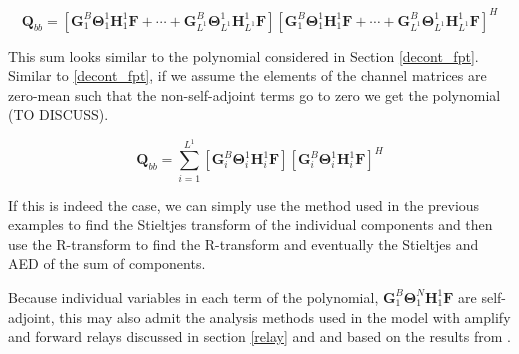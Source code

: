 \documentclass[12pt,a4paper]{report}
\begin{document}
\begin{equation}
\mathbf{Q}_{bb} = [\mathbf{G}^{B}_{1}\boldsymbol{\Theta}^{1}_{1}\mathbf{H}^{1}_{1}\mathbf{F} + 
\cdots + \mathbf{G}^{B}_{L^{1}}\boldsymbol{\Theta}^{1}_{L^{1}}\mathbf{H}^{1}_{L^{1}}\mathbf{F}]
[\mathbf{G}^{B}_{1}\boldsymbol{\Theta}^{1}_{1}\mathbf{H}^{1}_{1}\mathbf{F} + 
\cdots + \mathbf{G}^{B}_{L^{1}}\boldsymbol{\Theta}^{1}_{L^{1}}\mathbf{H}^{1}_{L^{1}}\mathbf{F}]^H
\end{equation}

This sum looks similar to the polynomial considered in Section \ref{decont_fpt}. Similar to \ref{decont_fpt}, if we assume the elements of the channel matrices are zero-mean such that the non-self-adjoint terms go to zero we get the polynomial   (TO DISCUSS). 

\begin{equation}
\mathbf{Q}_{bb} = \sum_{i=1}^{L^{1}}[\mathbf{G}^{B}_{i}\boldsymbol{\Theta}^{1}_{i}\mathbf{H}^{1}_{i}\mathbf{F}]
[\mathbf{G}^{B}_{i}\boldsymbol{\Theta}^{1}_{i}\mathbf{H}^{1}_{i}\mathbf{F}]^H
\end{equation}

If this is indeed the case, we can simply use the method used in the previous examples to find the Stieltjes transform of the individual components and then use the R-transform to find the R-transform and eventually the Stieltjes and AED of the sum of components. 
\par
Because individual variables in each term of the 
polynomial, $\mathbf{G}^{B}_{1}\boldsymbol{\Theta}^{N}_{1}\mathbf{H}^{1}_{1}\mathbf{F}$ are self-adjoint, this may also admit the analysis methods used in the model with amplify and forward relays discussed in section \ref{relay} and \cite{hadley2019capacity} and based on the results from \cite{belinschi2017analytic}.
\end{document}
